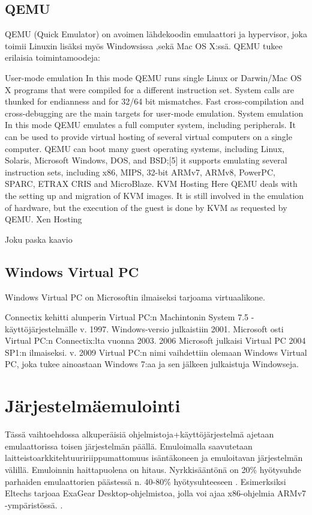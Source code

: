\documentclass[11pt,a4paper,oneside,article]{memoir}
\begin{document}
\subsection{QEMU}
QEMU (Quick Emulator) on avoimen lähdekoodin emulaattori ja hypervisor, joka toimii Linuxin lisäksi myös Windowsissa ,sekä Mac OS X:ssä. QEMU tukee erilaisia toimintamoodeja:

User-mode emulation
In this mode QEMU runs single Linux or Darwin/Mac OS X programs that were compiled for a different instruction set. System calls are thunked for endianness and for 32/64 bit mismatches. Fast cross-compilation and cross-debugging are the main targets for user-mode emulation.
System emulation
In this mode QEMU emulates a full computer system, including peripherals. It can be used to provide virtual hosting of several virtual computers on a single computer. QEMU can boot many guest operating systems, including Linux, Solaris, Microsoft Windows, DOS, and BSD;[5] it supports emulating several instruction sets, including x86, MIPS, 32-bit ARMv7, ARMv8, PowerPC, SPARC, ETRAX CRIS and MicroBlaze.
KVM Hosting
Here QEMU deals with the setting up and migration of KVM images. It is still involved in the emulation of hardware, but the execution of the guest is done by KVM as requested by QEMU.
Xen Hosting


\lipsum[1-5]

Joku paska kaavio

\subsection{Windows Virtual PC}
Windows Virtual PC on Microsoftin ilmaiseksi tarjoama virtuaalikone.

Connectix kehitti alunperin Virtual PC:n Machintonin System 7.5 -käyttöjärjestelmälle v. 1997. Windows-versio julkaistiin 2001. Microsoft osti Virtual PC:n Connectix:lta vuonna 2003. 2006 Microsoft julkaisi Virtual PC 2004 SP1:n ilmaiseksi. v. 2009 Virtual PC:n nimi vaihdettiin olemaan Windows Virtual PC, joka tukee ainoastaan Windows 7:aa ja sen jälkeen julkaistuja Windowseja.


\section{Järjestelmäemulointi}

Tässä vaihtoehdossa alkuperäisiä ohjelmistoja+käyttöjärjestelmä ajetaan emulaattorissa toisen järjestelmän päällä. Emuloimalla saavutetaan laitteistoarkkitehtuuririippumattomuus isäntäkoneen ja emuloitavan järjestelmän välillä. Emuloinnin haittapuolena on hitaus. Nyrkkisääntönä on 20\% hyötysuhde \cite{tinycc} parhaiden emulaattorien päästessä n. 40-80\% hyötysuhteeseen \cite{40pperf}. Esimerksiksi Eltechs tarjoaa ExaGear Desktop-ohjelmistoa, jolla voi ajaa x86-ohjelmia ARMv7 -ympäristössä. \cite{eltechs:exagear}. 
\end{document}
